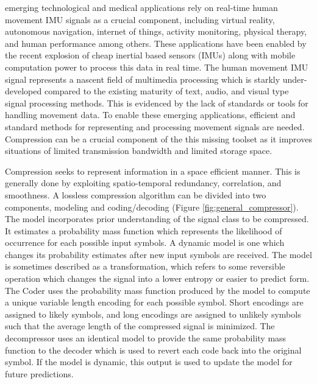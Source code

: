 \documentclass[journal]{IEEEtran}
\begin{document}
 emerging technological and medical applications rely on real-time human movement IMU signals as a crucial component, including virtual reality\cite{Ahmad2013}, autonomous navigation\cite{Campbell2018}, internet of things\cite{Fernandez-Carames2018}, activity monitoring\cite{Yang2010}\cite{Filippeschi2017}, physical therapy\cite{Patel2012}\cite{Shull2014}, and human performance\cite{Camomilla2018}\cite{GobinathAroganam2019} among others. These applications have been enabled by the recent explosion of cheap inertial based sensors (IMUs) along with mobile computation power to process this data in real time. The human movement IMU signal represents a nascent field of multimedia processing which is starkly under-developed compared to the existing maturity of text, audio, and visual type signal processing methods. This is evidenced by the lack of standards or tools for handling movement data. To enable these emerging applications, efficient and standard methods for representing and processing movement signals are needed. Compression can be a crucial component of the this missing toolset as it improves situations of limited transmission bandwidth and limited storage space.

Compression seeks to represent information in a space efficient manner. This is generally done by exploiting spatio-temporal redundancy, correlation, and smoothness\cite{Sayood2006}. A lossless compression algorithm can be divided into two components, modeling and coding/decoding (Figure \ref{fig:general_compressor})\cite{Nelson1996}. The model incorporates prior understanding of the signal class to be compressed. It estimates a probability mass function which represents the likelihood of occurrence for each possible input symbols. A dynamic model is one which changes its probability estimates after new input symbols are received. The model is sometimes described as a transformation, which refers to some reversible operation which changes the signal into a lower entropy or easier to predict form.  The Coder uses the probability mass function produced by the model to compute a unique variable length encoding for each possible symbol. Short encodings are assigned to likely symbols, and long encodings are assigned to unlikely symbols such that the average length of the compressed signal is minimized. The decompressor uses an identical model to provide the same probability mass function to the decoder which is used to revert each code back into the original symbol. If the model is dynamic, this output is used to update the model for future predictions.
\end{document}

